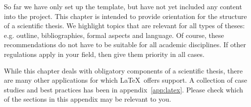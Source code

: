 So far we have only set up the template, but have not yet included any content
into the project. This chapter is intended to provide orientation for the
structure of a scientific thesis. We highlight topics that are relevant for all
types of theses: e.g. outline, bibliographies, formal aspects and language.
Of course, these recommendations do not have to be suitable for all academic
disciplines. If other regulations apply in your field, then give them priority
in all cases.

While this chapter deals with obligatory components of a scientific thesis,
there are many other applications for which \LaTeX\ offers support.
A collection of case studies and best practices has been in appendix~\ref{app:latex}.
Please check which of the sections in this appendix may be relevant to you.
